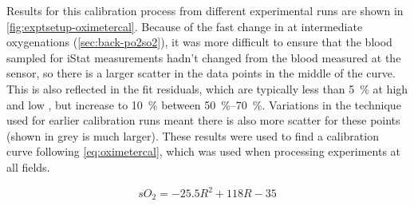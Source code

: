Results for this calibration process from different experimental runs are shown in \autoref{fig:exptsetup-oximetercal}.
Because of the fast change in \SOtwo at intermediate oxygenations (\autoref{sec:back-po2so2}), it was more difficult to ensure that the blood sampled for iStat measurements hadn't changed from the blood measured at the sensor, so there is a larger scatter in the data points in the middle of the curve.
This is also reflected in the fit residuals, which are typically less than \SI{5}{\percent} at high and low \SOtwo, but increase to \SI{10}{\percent} between \SIrange{50}{70}{\percent}.
Variations in the technique used for earlier calibration runs meant there is also more scatter for these points (shown in grey is much larger).
These results were used to find a calibration curve following \autoref{eq:oximetercal}, which was used when processing experiments at all fields.

\begin{equation}
\mathit{sO_2} = -25.5 R^2 + 118 R - 35
\label{eq:oximetercal}
\end{equation}
